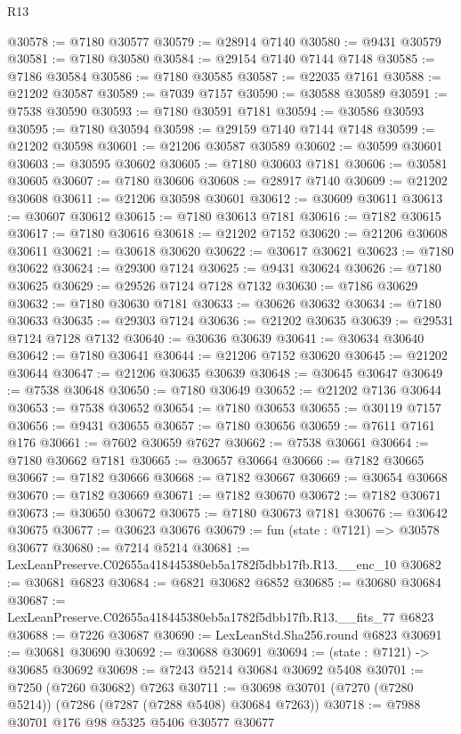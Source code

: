 \begin{lexlean}{R13}
\begin{coremodule}
@30578 := @7180 @30577
@30579 := @28914 @7140
@30580 := @9431 @30579
@30581 := @7180 @30580
@30584 := @29154 @7140 @7144 @7148
@30585 := @7186 @30584
@30586 := @7180 @30585
@30587 := @22035 @7161
@30588 := @21202 @30587
@30589 := @7039 @7157
@30590 := @30588 @30589
@30591 := @7538 @30590
@30593 := @7180 @30591 @7181
@30594 := @30586 @30593
@30595 := @7180 @30594
@30598 := @29159 @7140 @7144 @7148
@30599 := @21202 @30598
@30601 := @21206 @30587 @30589
@30602 := @30599 @30601
@30603 := @30595 @30602
@30605 := @7180 @30603 @7181
@30606 := @30581 @30605
@30607 := @7180 @30606
@30608 := @28917 @7140
@30609 := @21202 @30608
@30611 := @21206 @30598 @30601
@30612 := @30609 @30611
@30613 := @30607 @30612
@30615 := @7180 @30613 @7181
@30616 := @7182 @30615
@30617 := @7180 @30616
@30618 := @21202 @7152
@30620 := @21206 @30608 @30611
@30621 := @30618 @30620
@30622 := @30617 @30621
@30623 := @7180 @30622
@30624 := @29300 @7124
@30625 := @9431 @30624
@30626 := @7180 @30625
@30629 := @29526 @7124 @7128 @7132
@30630 := @7186 @30629
@30632 := @7180 @30630 @7181
@30633 := @30626 @30632
@30634 := @7180 @30633
@30635 := @29303 @7124
@30636 := @21202 @30635
@30639 := @29531 @7124 @7128 @7132
@30640 := @30636 @30639
@30641 := @30634 @30640
@30642 := @7180 @30641
@30644 := @21206 @7152 @30620
@30645 := @21202 @30644
@30647 := @21206 @30635 @30639
@30648 := @30645 @30647
@30649 := @7538 @30648
@30650 := @7180 @30649
@30652 := @21202 @7136 @30644
@30653 := @7538 @30652
@30654 := @7180 @30653
@30655 := @30119 @7157
@30656 := @9431 @30655
@30657 := @7180 @30656
@30659 := @7611 @7161 @176
@30661 := @7602 @30659 @7627
@30662 := @7538 @30661
@30664 := @7180 @30662 @7181
@30665 := @30657 @30664
@30666 := @7182 @30665
@30667 := @7182 @30666
@30668 := @7182 @30667
@30669 := @30654 @30668
@30670 := @7182 @30669
@30671 := @7182 @30670
@30672 := @7182 @30671
@30673 := @30650 @30672
@30675 := @7180 @30673 @7181
@30676 := @30642 @30675
@30677 := @30623 @30676
@30679 := fun (state : @7121) => @30578 @30677
@30680 := @7214 @5214
@30681 := LexLeanPreserve.C02655a418445380eb5a1782f5dbb17fb.R13.__enc_10
@30682 := @30681 @6823
@30684 := @6821 @30682 @6852
@30685 := @30680 @30684
@30687 := LexLeanPreserve.C02655a418445380eb5a1782f5dbb17fb.R13.__fits_77 @6823
@30688 := @7226 @30687
@30690 := LexLeanStd.Sha256.round @6823
@30691 := @30681 @30690
@30692 := @30688 @30691
@30694 := (state : @7121) -> @30685 @30692
@30698 := @7243 @5214 @30684 @30692 @5408
@30701 := @7250 (@7260 @30682) @7263
@30711 := @30698 @30701 (@7270 (@7280 @5214)) (@7286 (@7287 (@7288 @5408) @30684 @7263))
@30718 := @7988 @30701 @176 @98 @5325 @5406 @30577 @30677

\end{coremodule}
\end{lexlean}
